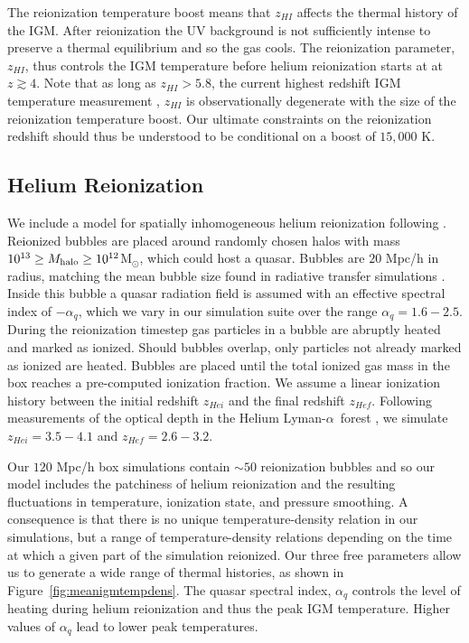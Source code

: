 \documentclass[a4paper,11pt]{article}
\newcommand{\Lya}{Lyman-$\alpha$}
\begin{document}
The reionization temperature boost means that $z_{HI}$ affects the thermal history of the IGM. After reionization the UV background is not sufficiently intense to preserve a thermal equilibrium and so the gas cools. The reionization parameter, $z_{HI}$, thus controls the IGM temperature before helium reionization starts at at $z \gtrsim 4$. Note that as long as $z_{HI} > 5.8$, the current highest redshift IGM temperature measurement \cite{Gaikwad:2020}, $z_{HI}$ is observationally degenerate with the size of the reionization temperature boost. Our ultimate constraints on the reionization redshift should thus be understood to be conditional on a boost of $15,000$ K.


\subsection{Helium Reionization}
\label{sec:helium}

We include a model for spatially inhomogeneous helium reionization following \cite{UptonSanderbeck:2020}. Reionized bubbles are placed around randomly chosen halos with mass $10^{13} \geq M_{\rm halo}\geq 10^{12}$M$_{\odot}$, which could host a quasar. Bubbles are $20$ Mpc/h in radius, matching the mean bubble size found in radiative transfer simulations \citep{McQuinn:2009}. Inside this bubble a quasar radiation field is assumed with an effective spectral index of $- \alpha_q$, which we vary in our simulation suite over the range $\alpha_q  = 1.6 - 2.5$. During the reionization timestep gas particles in a bubble are abruptly heated and marked as ionized. Should bubbles overlap, only particles not already marked as ionized are heated. Bubbles are placed until the total ionized gas mass in the box reaches
a pre-computed ionization fraction. We assume a linear ionization history between the initial redshift $z_{Hei}$ and the final redshift $z_{Hef}$. Following measurements of the optical depth in the Helium \Lya~forest \cite{Worseck:2019}, we simulate $z_{Hei} = 3.5 -  4.1$ and $z_{Hef} = 2.6 - 3.2$.

Our $120$ Mpc/h box simulations contain $\sim 50$ reionization bubbles and so our model includes the patchiness of helium reionization and the resulting fluctuations in temperature, ionization state, and pressure smoothing. A consequence is that there is no unique temperature-density relation in our simulations, but a range of temperature-density relations depending on the time at which a given part of the simulation reionized. Our three free parameters allow us to generate a wide range of thermal histories, as shown in Figure~\ref{fig:meanigmtempdens}. The quasar spectral index, $\alpha_q$ controls the level of heating during helium reionization and thus the peak IGM temperature. Higher values of $\alpha_q$ lead to lower peak temperatures.
\end{document}

